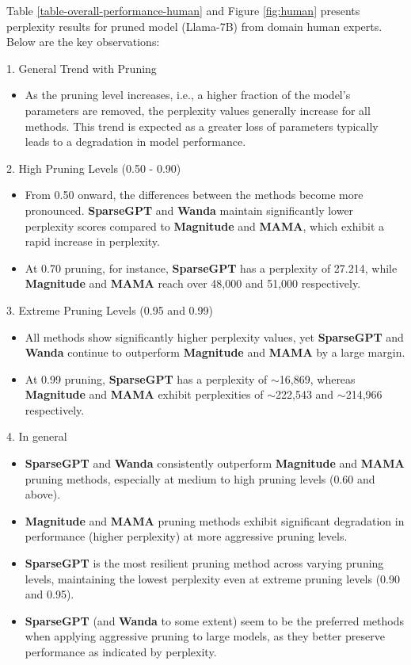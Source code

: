 \documentclass{article} %
\begin{document}
Table \ref{table-overall-performance-human} and Figure \ref{fig:human} presents perplexity results for pruned model (Llama-7B) from domain human experts. Below are the key observations:

1. General Trend with Pruning
\begin{itemize}
    \item As the pruning level increases, i.e., a higher fraction of the model's parameters are removed, the perplexity values generally increase for all methods. This trend is expected as a greater loss of parameters typically leads to a degradation in model performance.
\end{itemize}

2. High Pruning Levels (0.50 - 0.90)
\begin{itemize}
    \item From 0.50 onward, the differences between the methods become more pronounced. \textbf{SparseGPT} and \textbf{Wanda} maintain significantly lower perplexity scores compared to \textbf{Magnitude} and \textbf{MAMA}, which exhibit a rapid increase in perplexity.
    \item At 0.70 pruning, for instance, \textbf{SparseGPT} has a perplexity of 27.214, while \textbf{Magnitude} and \textbf{MAMA} reach over 48,000 and 51,000 respectively.
\end{itemize}

3. Extreme Pruning Levels (0.95 and 0.99)
\begin{itemize}
    \item All methods show significantly higher perplexity values, yet \textbf{SparseGPT} and \textbf{Wanda} continue to outperform \textbf{Magnitude} and \textbf{MAMA} by a large margin.
    \item At 0.99 pruning, \textbf{SparseGPT} has a perplexity of $\sim$16,869, whereas \textbf{Magnitude} and \textbf{MAMA} exhibit perplexities of $\sim$222,543 and $\sim$214,966 respectively.
\end{itemize}

4. In general
\begin{itemize}
    \item \textbf{SparseGPT} and \textbf{Wanda} consistently outperform \textbf{Magnitude} and \textbf{MAMA} pruning methods, especially at medium to high pruning levels (0.60 and above).
    \item \textbf{Magnitude} and \textbf{MAMA} pruning methods exhibit significant degradation in performance (higher perplexity) at more aggressive pruning levels.
    \item \textbf{SparseGPT} is the most resilient pruning method across varying pruning levels, maintaining the lowest perplexity even at extreme pruning levels (0.90 and 0.95).
    \item \textbf{SparseGPT} (and \textbf{Wanda} to some extent) seem to be the preferred methods when applying aggressive pruning to large models, as they better preserve performance as indicated by perplexity.
\end{itemize}
\end{document}
